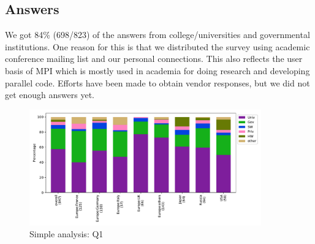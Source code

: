 
\subsection{Answers}


We got 84\% (698/823) of the answers from college/universities and governmental
institutions. One reason for this is that we distributed the survey using
academic conference mailing list and our personal connections. This also
reflects the user basis of MPI which is mostly used in academia for doing
research and developing parallel code. Efforts have been made to obtain vendor
responses, but we did not get enough answers yet.

\begin{figure}[htb]
\begin{center}
\includegraphics[width=10cm]{../pdfs/Q1.pdf}
\caption{Simple analysis: Q1}
\label{fig:Q1}
\end{center}
\end{figure}
